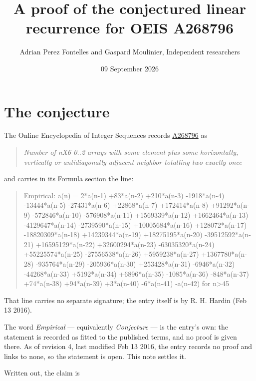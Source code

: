 \documentclass[11pt]{article}
\title{A proof of the conjectured linear recurrence for OEIS A268796}
\author{Adrian Perez Fontelles and Gaspard Moulinier, Independent researchers}
\date{09 September 2026}
\theoremstyle{definition}
\begin{document}
\maketitle
\section{The conjecture}

The Online Encyclopedia of Integer Sequences records \href{https://oeis.org/A268796}{A268796} as

\begin{quote}\itshape Number of nX6 0..2 arrays with some element plus some horizontally, vertically or antidiagonally adjacent neighbor totalling two exactly once\end{quote}

and carries in its Formula section the line:

\begin{quote}\ttfamily Empirical: a(n) = 2*a(n-1) +83*a(n-2) +210*a(n-3) -1918*a(n-4) -13444*a(n-5) -27431*a(n-6) +22868*a(n-7) +172414*a(n-8) +91292*a(n-9) -572846*a(n-10) -576908*a(n-11) +1569339*a(n-12) +1662464*a(n-13) -4129647*a(n-14) -2739590*a(n-15) +10005684*a(n-16) +128072*a(n-17) -18820309*a(n-18) +14239344*a(n-19) +18275195*a(n-20) -39512592*a(n-21) +16595129*a(n-22) +32600294*a(n-23) -63035320*a(n-24) +55225574*a(n-25) -27556538*a(n-26) +5959238*a(n-27) +1367780*a(n-28) -935764*a(n-29) -205936*a(n-30) +253428*a(n-31) -6946*a(n-32) -44268*a(n-33) +5192*a(n-34) +6896*a(n-35) -1085*a(n-36) -848*a(n-37) +74*a(n-38) +94*a(n-39) +3*a(n-40) -6*a(n-41) -a(n-42) for n>45\end{quote}

That line carries no separate signature; the entry itself is by R. H. Hardin (Feb 13 2016).

The word {\itshape Empirical} --- equivalently {\itshape Conjecture} --- is the entry's own: the statement is recorded as fitted to the published terms, and no proof is given there. As of revision 4, last modified Feb 13 2016, the entry records no proof and links to none, so the statement is open. This note settles it.

Written out, the claim is
\end{document}
